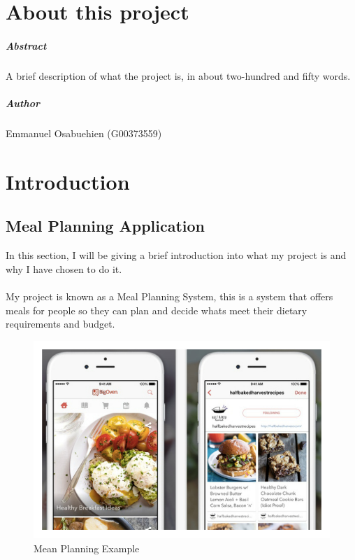 
\chapter*{About this project}
\paragraph{Abstract}
A brief description of what the project is, in about two-hundred and fifty words.

\paragraph{Author}
Emmanuel Osabuehien (G00373559)

\chapter{Introduction}
\section {Meal Planning Application}

In this section, I will be giving a brief introduction into what my project is and why I have chosen to do it.\\ \\
My project is known as a Meal Planning System, this is a system that offers meals for people so they can plan and decide whats meet their dietary requirements and budget.

\begin{center}
  \begin{figure}[H]
    \includegraphics[width=\textwidth]{img/mealplanningpic.jpg}
    \caption{Mean Planning Example}
    \label{fig: Example of a Meal Planning System}
  \end{figure}
\end{center}

